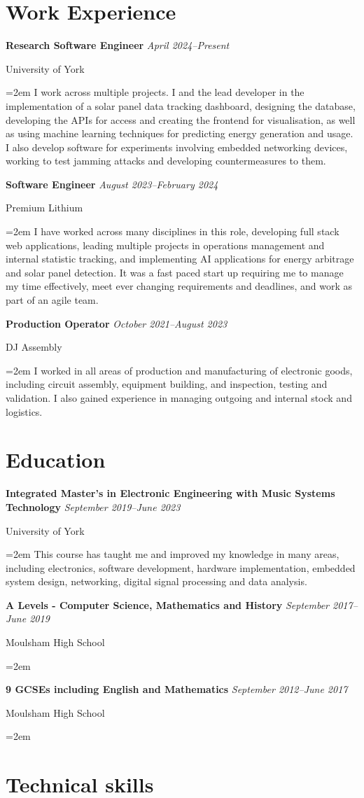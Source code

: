 \documentclass[12pt]{article} %
\newcommand{\education}[4]{
\noindent  \textbf{#1}
  \newline
  \noindent \textit{#2} \par
  \noindent #3 \par
\vspace*{0.5em}
  \noindent\hangindent=2em\hangafter=0 \small #4
\normalsize \par}
\newcommand{\work}[4]{
  \noindent  \textbf{#1}
  \newline
  \noindent \textit{#2} \par
  \noindent #3 \par
\vspace*{0.5em}
  \noindent\hangindent=2em\hangafter=0 \small #4 
\normalsize \par}
\begin{document}
\section*{Work Experience}
\work{Research Software Engineer}{April 2024--Present}{University of York}{I work across multiple projects. I and the lead developer in the implementation of a solar panel data tracking dashboard, designing the database, developing the APIs for access and creating the frontend for visualisation, as well as using machine learning techniques for predicting energy generation and usage. I also develop software for experiments involving embedded networking devices, working to test jamming attacks and developing countermeasures to them.}
\work{Software Engineer}{August 2023--February 2024}{Premium Lithium}{I have worked across many disciplines in this role, developing full stack web applications, leading multiple projects in operations management and internal statistic tracking, and implementing AI applications for energy arbitrage and solar panel detection. It was a fast paced start up requiring me to manage my time effectively, meet ever changing requirements and deadlines, and work as part of an agile team.}
\work{Production Operator}{October 2021--August 2023}{DJ Assembly}{I worked in all areas of production and manufacturing of electronic goods, including circuit assembly, equipment building, and inspection, testing and validation. I also gained experience in managing outgoing and internal stock and logistics.}

\section*{Education}

\education{Integrated Master's in Electronic Engineering with Music Systems Technology}{September 2019--June 2023}{University of York}{This course has taught me and improved my knowledge in many areas, including electronics, software development, hardware implementation, embedded system design, networking, digital signal processing and data analysis. \\}

\education{A Levels - Computer Science, Mathematics and History}{September 2017--June 2019}{Moulsham High School}{}

\education{9 GCSEs including English and Mathematics}{September 2012--June 2017}{Moulsham High School}{}

\section*{Technical skills}
\end{document}
